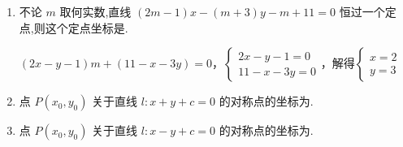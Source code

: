 \begin{enumerate}
    \item 不论 $m$ 取何实数,直线 $\left( {{2m} - 1}\right) x - \left( {m + 3}\right) y - m + {11} = 0$ 恒过一个定点,则这个定点坐标是.
    \begin{jieda}
        $(2x-y-1)m+(11-x-3y) = 0$，$\left\{\begin{array}{l}
             2x-y-1 = 0 \\
             11-x-3y = 0
        \end{array}\right.$，解得$\left\{\begin{array}{l}
             x = 2 \\
             y = 3
        \end{array}\right.$
    \end{jieda}
    
    \item 点 $P\left( {{x}_{0},{y}_{0}}\right)$ 关于直线 $l : x + y + c = 0$ 的对称点的坐标为.
    
    \item 点 $P\left( {{x}_{0},{y}_{0}}\right)$ 关于直线 $l : x - y + c = 0$ 的对称点的坐标为.
\end{enumerate}

